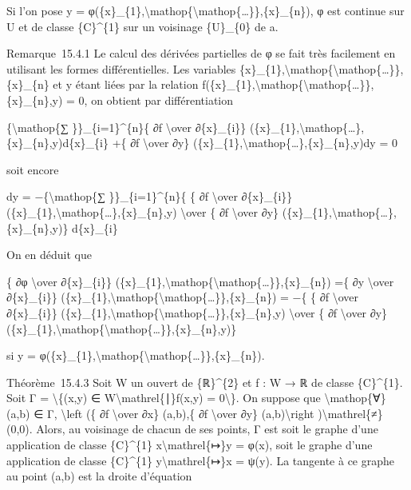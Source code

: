 \documentclass[]{article}
\begin{document}
Si l'on pose y =
φ(\{x\}\_\{1\},\textbackslash{}mathop\{\textbackslash{}mathop\{\ldots{}\}\},\{x\}\_\{n\}),
φ est continue sur U et de classe \{C\}\^{}\{1\} sur un voisinage
\{U\}\_\{0\} de a.

Remarque~15.4.1 Le calcul des dérivées partielles de φ se fait très
facilement en utilisant les formes différentielles. Les variables
\{x\}\_\{1\},\textbackslash{}mathop\{\textbackslash{}mathop\{\ldots{}\}\},\{x\}\_\{n\}
et y étant liées par la relation
f(\{x\}\_\{1\},\textbackslash{}mathop\{\textbackslash{}mathop\{\ldots{}\}\},\{x\}\_\{n\},y)
= 0, on obtient par différentiation

\{\textbackslash{}mathop\{∑ \}\}\_\{i=1\}\^{}\{n\}\{ ∂f
\textbackslash{}over ∂\{x\}\_\{i\}\}
(\{x\}\_\{1\},\textbackslash{}mathop\{\ldots{}\},\{x\}\_\{n\},y)d\{x\}\_\{i\}
+\{ ∂f \textbackslash{}over ∂y\}
(\{x\}\_\{1\},\textbackslash{}mathop\{\ldots{}\},\{x\}\_\{n\},y)dy = 0

soit encore

dy = −\{\textbackslash{}mathop\{∑ \}\}\_\{i=1\}\^{}\{n\}\{ \{ ∂f
\textbackslash{}over ∂\{x\}\_\{i\}\}
(\{x\}\_\{1\},\textbackslash{}mathop\{\ldots{}\},\{x\}\_\{n\},y)
\textbackslash{}over \{ ∂f \textbackslash{}over ∂y\}
(\{x\}\_\{1\},\textbackslash{}mathop\{\ldots{}\},\{x\}\_\{n\},y)\}
d\{x\}\_\{i\}

On en déduit que

\{ ∂φ \textbackslash{}over ∂\{x\}\_\{i\}\}
(\{x\}\_\{1\},\textbackslash{}mathop\{\textbackslash{}mathop\{\ldots{}\}\},\{x\}\_\{n\})
=\{ ∂y \textbackslash{}over ∂\{x\}\_\{i\}\}
(\{x\}\_\{1\},\textbackslash{}mathop\{\textbackslash{}mathop\{\ldots{}\}\},\{x\}\_\{n\})
= −\{ \{ ∂f \textbackslash{}over ∂\{x\}\_\{i\}\}
(\{x\}\_\{1\},\textbackslash{}mathop\{\textbackslash{}mathop\{\ldots{}\}\},\{x\}\_\{n\},y)
\textbackslash{}over \{ ∂f \textbackslash{}over ∂y\}
(\{x\}\_\{1\},\textbackslash{}mathop\{\textbackslash{}mathop\{\ldots{}\}\},\{x\}\_\{n\},y)\}

si y =
φ(\{x\}\_\{1\},\textbackslash{}mathop\{\textbackslash{}mathop\{\ldots{}\}\},\{x\}\_\{n\}).

Théorème~15.4.3 Soit W un ouvert de \{ℝ\}\^{}\{2\} et f : W → ℝ de
classe \{C\}\^{}\{1\}. Soit Γ = \textbackslash{}\{(x,y) ∈
W\textbackslash{}mathrel\{∣\}f(x,y) = 0\textbackslash{}\}. On suppose
que \textbackslash{}mathop\{∀\}(a,b) ∈ Γ, \textbackslash{}left (\{ ∂f
\textbackslash{}over ∂x\} (a,b),\{ ∂f \textbackslash{}over ∂y\}
(a,b)\textbackslash{}right )\textbackslash{}mathrel\{≠\}(0,0). Alors, au
voisinage de chacun de ses points, Γ est soit le graphe d'une
application de classe \{C\}\^{}\{1\} x\textbackslash{}mathrel\{↦\}y =
φ(x), soit le graphe d'une application de classe \{C\}\^{}\{1\}
y\textbackslash{}mathrel\{↦\}x = ψ(y). La tangente à ce graphe au point
(a,b) est la droite d'équation
\end{document}
